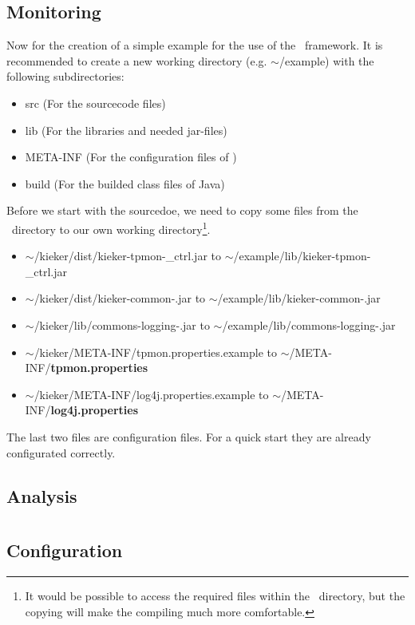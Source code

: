 \documentclass[a4paper, oneside, 11pt]{scrartcl}
\begin{document}
\subsection{Monitoring}
Now for the creation of a simple example for the use of the \Kieker\ framework. It is recommended to create a new working directory (e.g. $\sim$/example) with the following subdirectories:
\begin{itemize}
\item src (For the sourcecode files)
\item lib (For the libraries and needed jar-files)
\item META-INF (For the configuration files of \Kieker)
\item build (For the builded class files of Java)
\end{itemize}
Before we start with the sourcedoe, we need to copy some files from the \Kieker\ directory to our own working directory\footnote{It would be possible to access the required files within the \Kieker\ directory, but the copying will make the compiling much more comfortable.}.
\begin{itemize}
\item $\sim$/kieker/dist/kieker-tpmon-\version\_ctrl.jar to $\sim$/example/lib/kieker-tpmon-\version\_ctrl.jar
\item $\sim$/kieker/dist/kieker-common-\version.jar to $\sim$/example/lib/kieker-common-\version.jar
\item $\sim$/kieker/lib/commons-logging-\version.jar to $\sim$/example/lib/commons-logging-\version.jar
\item $\sim$/kieker/META-INF/tpmon.properties.example to $\sim$/META-INF/\textbf{tpmon.properties}
\item $\sim$/kieker/META-INF/log4j.properties.example to $\sim$/META-INF/\textbf{log4j.properties}
\end{itemize}
The last two files are configuration files. For a quick start they are already configurated correctly. 

\subsection{Analysis}

\section{\KiekerMonitoring}
\subsection{Configuration}
\end{document}
